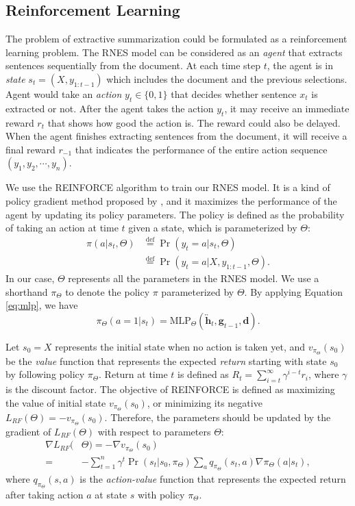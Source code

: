\documentclass[letterpaper]{article} \usepackage{aaai18}  \usepackage{times}  \usepackage{helvet}  \usepackage{courier}  \usepackage{url}  \usepackage{graphicx}  \usepackage{amssymb}
\begin{document}
	\subsection{Reinforcement Learning} 

	The problem of extractive summarization could be formulated as a reinforcement learning problem. The RNES model can be considered as an \emph{agent} that extracts sentences sequentially from the document. At each time step $t$, the agent is in \emph{state} $s_t = (X, y_{1:t-1})$ which includes the document and the previous selections. Agent would take an \emph{action} $y_t \in \{0,1\}$ that decides whether sentence $x_t$ is extracted or not. After the agent takes the action $y_t$, it may receive an immediate reward $r_{t}$ that shows how good the action is. The reward could also be delayed. When the agent finishes extracting sentences from the document, it will receive a final reward $r_{-1}$ that indicates the performance of the entire action sequence $(y_1, y_2, \cdots, y_n)$.
	
	We use the REINFORCE algorithm to train our RNES model. It is a kind of policy gradient method proposed by  \cite{williams_simple_1992}, and it maximizes the performance of the agent by updating its policy parameters. The policy is defined as the probability of taking an action at time $t$ given a state, which is parameterized by $\Theta$:
	\begin{align*}
	\pi(a|s_t,\Theta) &\overset{\text{def}}{=} \Pr(y_t=a|s_t,\Theta) \\
	&\overset{\text{def}}{=} \Pr(y_t=a|X, y_{1:t-1}, \Theta) .
	\end{align*}
	In our case, $\Theta$ represents all the parameters in the RNES model. We use a shorthand $\pi_{\Theta}$ to denote the policy $\pi$ parameterized by $\Theta$. By applying Equation \ref{eq:mlp}, we have
	\begin{equation*}
	\pi_{\Theta}(a=1|s_t) = \text{MLP}_{\Theta}(\overleftrightarrow{\mathbf{h}}_t, \mathbf{g}_{t-1}, \mathbf{d} ) .
	\end{equation*}
	
	Let $s_0=X$ represents the initial state when no action is taken yet, and $v_{\pi_{\Theta}}(s_0)$ be the \emph{value} function that represents the expected \emph{return} starting with state $s_0$ by following policy $\pi_{\Theta}$. Return at time $t$ is defined as $R_t=\sum_{i=t}^{\infty} \gamma^{i-t} r_i$, where $\gamma$ is the discount factor. The objective of REINFORCE is defined as maximizing the value of initial state $v_{\pi_{\Theta}}(s_0)$, or minimizing its negative $L_{RF}(\Theta) = - v_{\pi_{\Theta}}(s_0)$. Therefore, the parameters should be updated by the gradient of $L_{RF}(\Theta)$ with respect to parameters $\Theta$:
	\begin{align*}
	\nabla L_{RF}(&\Theta) = - \nabla v_{\pi_{\Theta}}(s_0) \\ 
	=& - \sum_{t=1}^{n} \gamma^t \Pr(s_t | s_0, \pi_{\Theta}) \sum_{a} q_{\pi_{\Theta}}(s_t,a) \nabla \pi_{\Theta}(a|s_t) ,
	\end{align*} 
	where $q_{\pi_{\Theta}}(s,a)$ is the \emph{action-value} function that represents the expected return after taking action $a$ at state $s$ with policy $\pi_{\Theta}$. 
\end{document}
